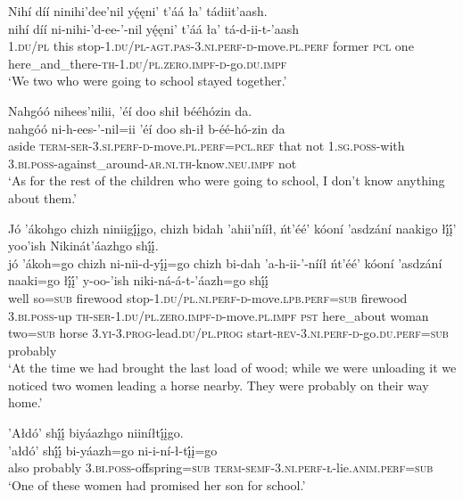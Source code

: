 \ea\label{ex:text1-29-16}
Nihí díí ninihi’dee’nil yę́ęni’ t’áá ła’ tádiit’aash.\\
\gll nihí	díí	ni-nihi-’d-ee-’-nil	yę́ęni’	t’áá	ła’	tá-d-ii-t-’aash\\
     1.\textsc{du}/\textsc{pl}	this	stop-1.\textsc{du}/\textsc{pl}-\textsc{agt}.\textsc{pas}-3.\textsc{ni}.\textsc{perf}-\textsc{d}-move.\textsc{pl}.\textsc{perf}	former	\textsc{pcl}	one	here\_and\_there-\textsc{th}-1.\textsc{du}/\textsc{pl}.\textsc{zero}.\textsc{impf}-\textsc{d}-go.\textsc{du}.\textsc{impf}\\
\glt `We two who were going to school stayed together.'
\z

\ea\label{ex:text1-29-17}
Nahgóó nihees’nilii, ’éí doo shił bééhózin da.\\
\gll nahgóó	ni-h-ees-’-nil=ii	’éí	doo	sh-ił	b-éé-hó-zin	da\\
     aside	\textsc{term}-\textsc{ser}-3.\textsc{si}.\textsc{perf}-\textsc{d}-move.\textsc{pl}.\textsc{perf}=\textsc{pcl}.\textsc{ref}	that	not	1.\textsc{sg}.\textsc{poss}-with	3.\textsc{bi}.\textsc{poss}-against\_around-\textsc{ar}.\textsc{ni}.\textsc{th}-know.\textsc{neu}.\textsc{impf}	not\\
\glt `As for the rest of the children who were going to school, I don't know anything about them.'
\z

\ea\label{ex:text1-30-1}
Jó ’ákohgo chizh niniigį́įgo, chizh bidah ’ahii’nííł, ńt’éé’ kóoní ’asdzání naakigo łį́į́’ yoo’ish Nikinát’áazhgo shį́į́.\\
\gll jó	’ákoh=go	chizh	ni-nii-d-yį́į=go	chizh	bi-dah	’a-h-ii-’-nííł	ńt’éé’	kóoní	’asdzání	naaki=go	łį́į́’	y-oo-’ish	niki-ná-á-t-’áazh=go	shį́į́\\
     well	so=\textsc{sub}	firewood	stop-1.\textsc{du}/\textsc{pl}.\textsc{ni}.\textsc{perf}-\textsc{d}-move.\textsc{lpb}.\textsc{perf}=\textsc{sub}	firewood	3.\textsc{bi}.\textsc{poss}-up	\textsc{th}-\textsc{ser}-1.\textsc{du}/\textsc{pl}.\textsc{zero}.\textsc{impf}-\textsc{d}-move.\textsc{pl}.\textsc{impf}	\textsc{pst}	here\_about	woman	two=\textsc{sub}	horse	3.\textsc{yi}-3.\textsc{prog}-lead.\textsc{du}/\textsc{pl}.\textsc{prog}	start-\textsc{rev}-3.\textsc{ni}.\textsc{perf}-\textsc{d}-go.\textsc{du}.\textsc{perf}=\textsc{sub}	probably\\
\glt `At the time we had brought the last load of wood; while we were unloading it we noticed two women leading a horse nearby. They were probably on their way home.'
\z

\ea\label{ex:text1-30-2}
’Ałdó’ shį́į́ biyáazhgo niiníłtį́įgo.\\
\gll ’ałdó’	shį́į́	bi-yáazh=go	ni-i-ní-ł-tį́į=go\\
     also	probably	3.\textsc{bi}.\textsc{poss}-offspring=\textsc{sub}	\textsc{term}-\textsc{semf}-3.\textsc{ni}.\textsc{perf}-\textsc{ł}-lie.\textsc{anim}.\textsc{perf}=\textsc{sub}\\
\glt `One of these women had promised her son for school.'
\z

